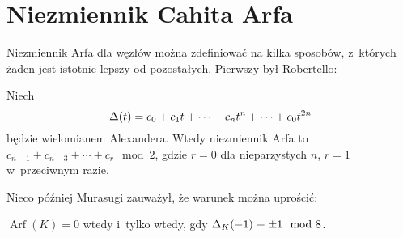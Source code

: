 \section{Niezmiennik Cahita Arfa} %
\label{sub:arf}
Niezmiennik Arfa dla węzłów można zdefiniować na kilka sposobów, z~których żaden jest istotnie lepszy od pozostałych.
Pierwszy był Robertello:

\begin{proposition}[Robertello, 1965]
    Niech
    \begin{equation}
        \Delta (t)=c_{0}+c_{1}t+\cdots +c_{n}t^{n}+\cdots +c_{0}t^{2n}
    \end{equation}
    będzie wielomianem Alexandera.
    Wtedy niezmiennik Arfa to $c_{n-1}+c_{n-3}+\cdots +c_{r}\mod 2$, gdzie $r = 0$ dla nieparzystych $n$, $r = 1$ w~przeciwnym razie.
\end{proposition}

Nieco później Murasugi zauważył, że warunek można uprościć:

\begin{proposition}[Murasugi, 1969]
    \label{arf_murasugi}
    $\operatorname{Arf}(K) = 0$ wtedy i~tylko wtedy, gdy $\Delta_K(-1) \equiv \pm 1 \mod 8$.
\end{proposition}

